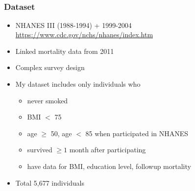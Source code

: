 \documentclass{philslides}
\begin{document}
\subsection*{}
\frame
{
	\frametitle{Dataset}
	\begin{itemize}
		\item NHANES III (1988-1994) + 1999-2004\\
			{\tiny \url{https://www.cdc.gov/nchs/nhanes/index.htm}}
		\item Linked mortality data from 2011
		\item Complex survey design \autocite{Lumley2010}
		\item My dataset includes only individuals who
		\begin{itemize}
			\item never smoked
			\item BMI $<$ 75
			\item age $\geq$ 50, age $<$ 85 when participated in NHANES
			\item survived $\geq 1$ month after participating
			\item have data for BMI, education level, followup mortality
		\end{itemize}
		\item Total 5,677 individuals
	\end{itemize}
}
\end{document}
